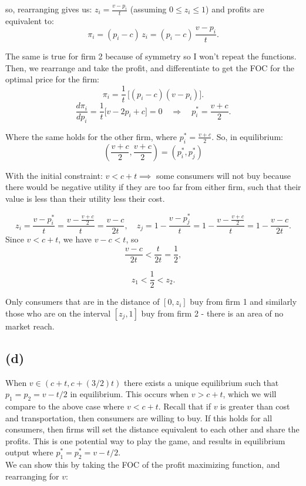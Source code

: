 \documentclass{article}
\begin{document}
so, rearranging gives us: $z_i = \tfrac{v - p_i}{t}$ (assuming $0 \le z_i \le 1$) and profits are equivalent to:
  \[
  \pi_i = (p_i - c)\,z_i = (p_i - c)\,\frac{v - p_i}{t}.
  \]

The same is true for firm 2 because of symmetry so I won't repeat the functions. Then, we rearrange and take the profit, and differentiate to get the FOC for the optimal price for the firm: 
\[
\pi_i = \frac{1}{t}\,\bigl[(p_i - c)(v - p_i)\bigr].
\]
\[
\frac{d\pi_i}{dp_i} = \frac{1}{t}\bigl[v - 2p_i + c\bigr] = 0
\quad\Longrightarrow\quad p_i^* = \frac{v + c}{2}.
\]


Where the same holds for the other firm, where $p_i^* = \frac{v + c}{2}$. So, in equilibrium:
\[
(\frac{v +c}{2}, \frac{v + c}{2}) = (p_i^*, p_j^*)
\]

With the initial constraint: $v < c + t \implies$ some consumers will not buy because there would be negative utility if they are too far from either firm, such that their value is less than their utility less their cost. 

\[
z_i = \frac{v - p_i^*}{t} = \frac{v - \frac{v + c}{2}}{t} = \frac{v - c}{2t}, 
\quad
z_j = 1 - \frac{v - p_j^*}{t} = 1 - \frac{v - \frac{v + c}{2}}{t} = 1 - \frac{v - c}{2t}.
\]
Since $v < c + t$, we have $v - c < t$, so
\[
\frac{v - c}{2t} < \frac{t}{2t} = \frac{1}{2},
\]

\[
z_1 < \frac{1}{2} < z_2.
\]

Only consumers that are in the distance of $[0, z_i]$ buy from firm 1 and similarly those who are on the interval $[z_j, 1]$ buy from firm 2 - there is an area of no market reach. 

\subsection*{(d)}

When $v \in (c + t, c + (3/2)t)$ there exists a unique equilibrium such that $p_1 = p_2 = v - t /2$ in equilibrium. This occurs when $ v > c + t$, which we will compare to the above case where $ v < c + t$. Recall that if $v$ is greater than cost and transportation, then consumers are willing to buy. If this holds for all consumers, then firms will set the distance equivalent to each other and share the profits. This is one potential way to play the game, and results in equilibrium output where $p_1^* = p_2^* = v - t /2$.
\\
We can show this by taking the FOC of the profit maximizing function, and rearranging for $v$:
\end{document}
